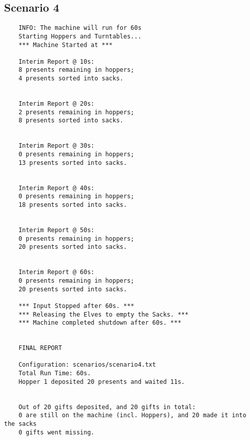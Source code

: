 \documentclass[a4paper,12pt]{article}
\begin{document}
        
    \subsection{Scenario 4}
    \begin{verbatim}
    INFO: The machine will run for 60s
    Starting Hoppers and Turntables...
    *** Machine Started at ***

    Interim Report @ 10s:
    8 presents remaining in hoppers;
    4 presents sorted into sacks.


    Interim Report @ 20s:
    2 presents remaining in hoppers;
    8 presents sorted into sacks.


    Interim Report @ 30s:
    0 presents remaining in hoppers;
    13 presents sorted into sacks.


    Interim Report @ 40s:
    0 presents remaining in hoppers;
    18 presents sorted into sacks.


    Interim Report @ 50s:
    0 presents remaining in hoppers;
    20 presents sorted into sacks.


    Interim Report @ 60s:
    0 presents remaining in hoppers;
    20 presents sorted into sacks.

    *** Input Stopped after 60s. ***
    *** Releasing the Elves to empty the Sacks. ***
    *** Machine completed shutdown after 60s. ***


    FINAL REPORT

    Configuration: scenarios/scenario4.txt
    Total Run Time: 60s.
    Hopper 1 deposited 20 presents and waited 11s.


    Out of 20 gifts deposited, and 20 gifts in total:
    0 are still on the machine (incl. Hoppers), and 20 made it into the sacks
    0 gifts went missing.
    \end{verbatim}
\end{document}

